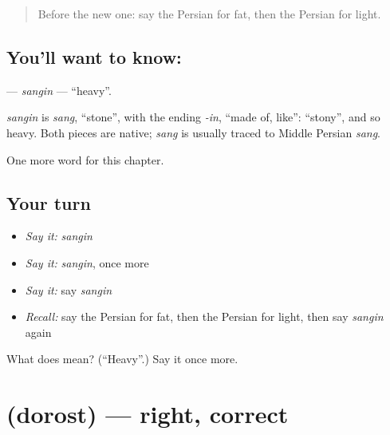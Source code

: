 \label{lesson:FA-C62-sangin}



\begin{quote}
Before the new one: say the Persian for fat, then the Persian for light.
\end{quote}

\subsection*{You'll want to know: }
\textbf{} — \emph{sangin} — \textquotedblleft{}heavy\textquotedblright{}.

\begin{cousinweb}
\emph{sangin} is \emph{sang}, \textquotedblleft{}stone\textquotedblright{}, with the ending \emph{-in}, \textquotedblleft{}made of, like\textquotedblright{}: \textquotedblleft{}stony\textquotedblright{}, and so heavy. Both pieces are native; \emph{sang} is usually traced to Middle Persian \emph{sang}.
\end{cousinweb}

\begin{grammarlens}[title={What you've built}]
One more word for this chapter.
\end{grammarlens}

\subsection*{Your turn}
\begin{itemize}
\raggedright
  \item \emph{Say it:} \emph{sangin}
  \item \emph{Say it:} \emph{sangin}, once more
  \item \emph{Say it:} say \emph{sangin}
  \item \emph{Recall:} say the Persian for fat, then the Persian for light, then say \emph{sangin} again
\end{itemize}

\begin{tcolorbox}[breakable,colback=teal!4,colframe=teal!35!black,title={Before you move on}]
What does  mean? (\textquotedblleft{}Heavy\textquotedblright{}.) Say it once more.
\end{tcolorbox}
\section[\texorpdfstring{\fa{درست} (dorost)}{درست (dorost)}]{ (dorost) — right, correct}


